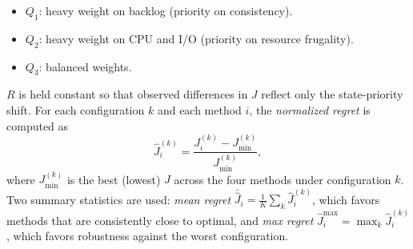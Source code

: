 \begin{itemize}
    \item $Q_1$: heavy weight on backlog (priority on consistency).
    \item $Q_2$: heavy weight on CPU and I/O (priority on resource frugality).
    \item $Q_3$: balanced weights.
\end{itemize}
$R$ is held constant so that observed differences in $J$ reflect only the state-priority shift. For each configuration $k$ and each method $i$, the \textit{normalized regret} is computed as
\begin{equation}
\hat{J}_i^{(k)} = \frac{J_i^{(k)} - J_{\min}^{(k)}}{J_{\min}^{(k)}},
\label{eq:nregret}
\end{equation}
where $J_{\min}^{(k)}$ is the best (lowest) $J$ across the four methods under configuration $k$. Two summary statistics are used: \textit{mean regret} $\bar{\hat{J}}_i = \frac{1}{K}\sum_k \hat{J}_i^{(k)}$, which favors methods that are consistently close to optimal, and \textit{max regret} $\hat{J}_i^{\max} = \max_k \hat{J}_i^{(k)}$, which favors robustness against the worst configuration.
